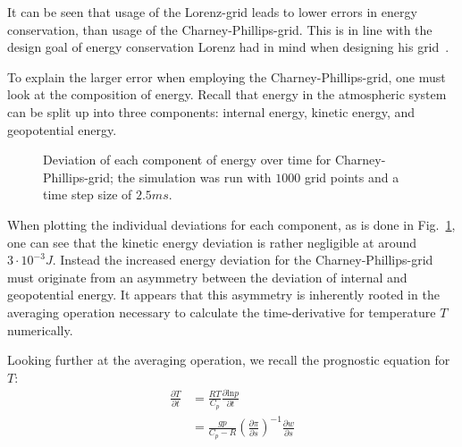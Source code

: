 It can be seen that usage of the Lorenz-grid leads to lower errors in energy conservation, than usage of the Charney-Phillips-grid.
This is in line with the design goal of energy conservation Lorenz had in mind when designing his grid~\cite{lorenz1960energy}.

To explain the larger error when employing the Charney-Phillips-grid, one must look at the composition of energy.
Recall that energy in the atmospheric system can be split up into three components: internal energy, kinetic energy, and geopotential energy.

\begin{figure}[!h]
    \caption{Deviation of each component of energy over time for Charney-Phillips-grid;
    the simulation was run with $1000$ grid points and a time step size of $2.5ms$.
    }
    \label{fig:cp_energy_split}
\end{figure}
\noindent
When plotting the individual deviations for each component, as is done in Fig.~\ref{fig:cp_energy_split}, one can see that the kinetic energy deviation is rather negligible at around $3\cdot10^{-3}J$.
Instead the increased energy deviation for the Charney-Phillips-grid must originate from an asymmetry between the deviation of internal and geopotential energy.
It appears that this asymmetry is inherently rooted in the averaging operation necessary to calculate the time-derivative for temperature $T$ numerically.

Looking further at the averaging operation, we recall the prognostic equation for $T$:
\begin{align*}
\frac{\partial T}{\partial t} &= \frac{RT}{C_p}\frac{\partial \text{ln}p}{\partial t}\\
&=\frac{gp}{C_p-R}\left(\frac{\partial \pi}{\partial s}\right)^{-1} \frac{\partial w}{\partial s}
\end{align*}

